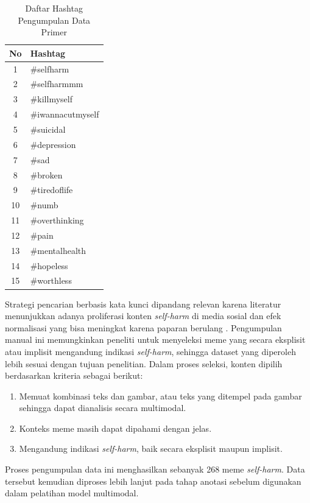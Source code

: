 \begin{table}[H]
    \centering
    \caption{Daftar Hashtag Pengumpulan Data Primer}
    \label{tabel:hashtag_pengumpulan_data}
    \small
    \setlength{\tabcolsep}{8pt}
    \renewcommand{\arraystretch}{1.1}
    \begin{tabular}{c l}
        \hline
        \textbf{No} & \textbf{Hashtag} \\
        \hline
        1 & \#selfharm \\
        2 & \#selfharmmm \\
        3 & \#killmyself \\
        4 & \#iwannacutmyself \\
        5 & \#suicidal \\
        6 & \#depression \\
        7 & \#sad \\
        8 & \#broken \\
        9 & \#tiredoflife \\
        10 & \#numb \\
        11 & \#overthinking \\
        12 & \#pain \\
        13 & \#mentalhealth \\
        14 & \#hopeless \\
        15 & \#worthless \\
        \hline
    \end{tabular}
\end{table}


Strategi pencarian berbasis kata kunci dipandang relevan karena literatur menunjukkan adanya proliferasi konten \textit{self-harm} di media sosial dan efek normalisasi yang bisa meningkat karena paparan berulang \cite{MoraledaEsteban2025SelfHarm}. Pengumpulan manual ini memungkinkan peneliti untuk menyeleksi meme yang secara eksplisit atau implisit mengandung indikasi \textit{self-harm}, sehingga dataset yang diperoleh lebih sesuai dengan tujuan penelitian. Dalam proses seleksi, konten dipilih berdasarkan kriteria sebagai berikut:
\begin{enumerate}
    \item Memuat kombinasi teks dan gambar, atau teks yang ditempel pada gambar sehingga dapat dianalisis secara multimodal.
    \item Konteks meme masih dapat dipahami dengan jelas.
    \item Mengandung indikasi \textit{self-harm}, baik secara eksplisit maupun implisit.
\end{enumerate}
Proses pengumpulan data ini menghasilkan sebanyak 268 meme \textit{self-harm}. Data tersebut kemudian diproses lebih lanjut pada tahap anotasi sebelum digunakan dalam pelatihan model multimodal.

